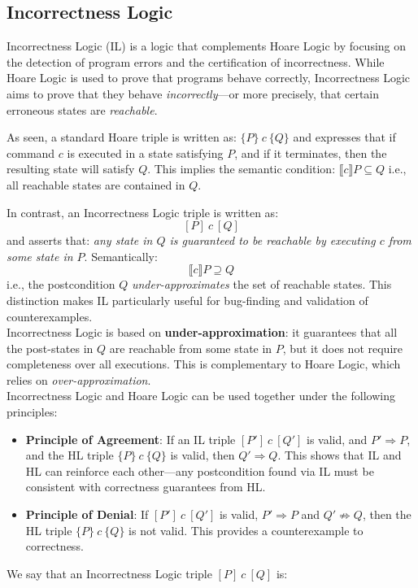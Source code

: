\documentclass[parskip=half]{scrartcl}
\begin{document}
\subsection{Incorrectness Logic}

Incorrectness Logic (IL) is a logic that complements Hoare Logic by focusing on the detection of program errors and the certification of incorrectness. While Hoare Logic is used to prove that programs behave correctly, Incorrectness Logic aims to prove that they behave \emph{incorrectly}—or more precisely, that certain erroneous states are \emph{reachable}.

As seen, a standard Hoare triple is written as: $\{P\}~c~\{Q\}$ and expresses that if command $c$ is executed in a state satisfying $P$, and if it terminates, then the resulting state will satisfy $Q$. This implies the semantic condition: $\llbracket c \rrbracket P \subseteq Q$
i.e., all reachable states are contained in $Q$.

In contrast, an Incorrectness Logic triple is written as:
\[
[P]~c~[Q]
\]
and asserts that: \emph{any state in $Q$ is guaranteed to be reachable by executing $c$ from some state in $P$}. Semantically:
\[
\llbracket c \rrbracket P \supseteq Q
\]
i.e., the postcondition $Q$ \emph{under-approximates} the set of reachable states. This distinction makes IL particularly useful for bug-finding and validation of counterexamples.
\\Incorrectness Logic is based on \textbf{under-approximation}: it guarantees that all the post-states in $Q$ are reachable from some state in $P$, but it does not require completeness over all executions. This is complementary to Hoare Logic, which relies on \emph{over-approximation}.
\\ Incorrectness Logic and Hoare Logic can be used together under the following principles:

\begin{itemize}
  \item \textbf{Principle of Agreement}: If an IL triple $[P']~c~[Q']$ is valid, and $P' \Rightarrow P$, and the HL triple $\{P\}~c~\{Q\}$ is valid, then $Q' \Rightarrow Q$. This shows that IL and HL can reinforce each other—any postcondition found via IL must be consistent with correctness guarantees from HL.
  \item \textbf{Principle of Denial}: If $[P']~c~[Q']$ is valid, $P' \Rightarrow P$ and $Q' \not\Rightarrow Q$, then the HL triple $\{P\}~c~\{Q\}$ is not valid. This provides a counterexample to correctness.
\end{itemize}
We say that an Incorrectness Logic triple $[P]~c~[Q]$ is:
\end{document}
